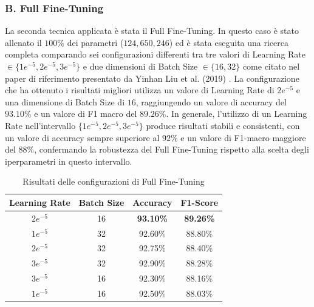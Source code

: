 \documentclass[a4paper,12pt]{article}
\begin{document}
\subsubsection*{B. Full Fine-Tuning}
La seconda tecnica applicata è stata il Full Fine-Tuning. In questo caso è stato allenato il $100\%$ dei parametri ($124,650,246$) ed è stata eseguita una ricerca completa comparando sei configurazioni differenti tra tre valori di Learning Rate $\in \{1e^{-5}, 2e^{-5}, 3e^{-5}\}$ e due dimensioni di Batch Size $\in \{16, 32\}$ come citato nel paper di riferimento presentato da Yinhan Liu et al. (2019) \cite{yinhan-liu-etal-2019-roberta}.
La configurazione che ha ottenuto i risultati migliori utilizza un valore di Learning Rate di $2e^{-5}$ e una dimensione di Batch Size di $16$, raggiungendo un valore di accuracy del $93.10\%$ e un valore di F1 macro del $89.26\%$. In generale, l'utilizzo di un Learning Rate nell'intervallo $\{1e^{-5}, 2e^{-5}, 3e^{-5}\}$ produce risultati stabili e consistenti, con un valore di accuracy sempre superiore al $92\%$ e un valore di F1-macro maggiore del $88\%$, confermando la robustezza del Full Fine-Tuning rispetto alla scelta degli iperparametri in questo intervallo.

\begin{table}[H]
    \centering
    \begin{tabular}{|c|c|c|c|}
        \hline
        \textbf{Learning Rate} & \textbf{Batch Size} & \textbf{Accuracy} & \textbf{F1-Score} \\
        \hline
        $2e^{-5}$              & 16                  & \textbf{93.10\%}  & \textbf{89.26\%}  \\
        $1e^{-5}$              & 32                  & 92.60\%           & 88.80\%           \\
        $2e^{-5}$              & 32                  & 92.75\%           & 88.40\%           \\
        $3e^{-5}$              & 32                  & 92.90\%           & 88.28\%           \\
        $3e^{-5}$              & 16                  & 92.30\%           & 88.16\%           \\
        $1e^{-5}$              & 16                  & 92.50\%           & 88.03\%           \\
        \hline
    \end{tabular}
    \caption{Risultati delle configurazioni di Full Fine-Tuning}
\end{table}
\end{document}
